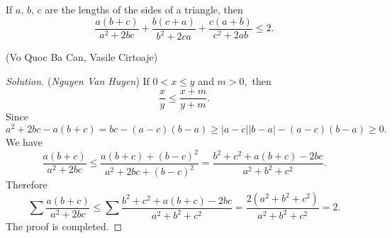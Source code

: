 \documentclass[12pt,a4paper]{book}
\begin{document}
\begin{pro_no_count}
If $a,\,b,\,c$ are the lengths of the sides of a triangle, then
\[\frac{a(b+c)}{a^2+2bc}+\frac{b(c+a)}{b^2+2ca}+\frac{c(a+b)}{c^2+2ab} \le 2.\]
\begin{flushright}(Vo Quoc Ba Can, Vasile Cirtoaje)\end{flushright}
\end{pro_no_count}

\begin{proof}[\cmss Solution]
(\textit{Nguyen Van Huyen}) If $0 < x \leqslant y$ and $m > 0,$ then
\[\frac{x}{y} \le \frac{x+m}{y+m}.\]
Since
\[a^2+2 b c-a(b+c)=b c-(a-c)(b-a) \geq |a-c||b-a|-(a-c)(b-a) \geq 0.\]
We have
\[\frac{a(b+c)}{a^2+2bc} \le \frac{a(b+c)+(b-c)^2}{a^2+2bc+(b-c)^2} = \frac{b^2+c^2+a(b+c)-2bc}{a^2+b^2+c^2}.\]
Therefore
\[\sum \frac{a(b+c)}{a^2+2bc} \le \sum \frac{b^2+c^2+a(b+c)-2bc}{a^2+b^2+c^2} = \frac{2(a^2+b^2+c^2)}{a^2+b^2+c^2} = 2.\]
The proof is completed.
\end{proof}
\end{document}
